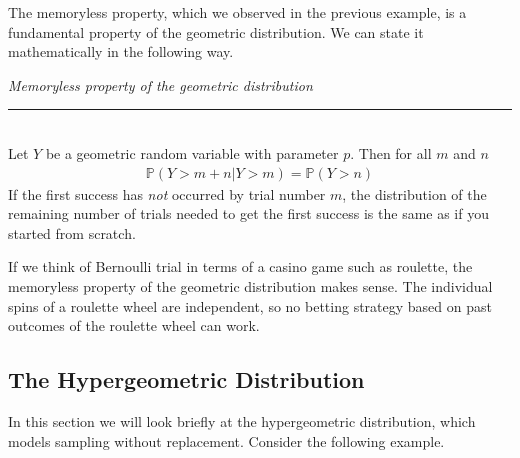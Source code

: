 \documentclass[12pt]{article}
\theoremstyle{definition}
\theoremstyle{remark}
\def\P{{\mathbb P}}
\begin{document}
The memoryless property, which we observed in the previous example, is a fundamental property of the geometric distribution. We can state it mathematically in the following way.

\begin{framed}
\emph{Memoryless property of the geometric distribution}\\
  \rule{\dimexpr{}\fboxrule}{.1pt} \\
Let $Y$ be a geometric random variable with parameter $p$. Then for all $m$ and $n$
\begin{align*}
\P(Y > m + n | Y > m) = \P(Y > n)
\end{align*}
If the first success has \emph{not} occurred by trial number $m$, the distribution of the remaining number of trials needed to get the first success is the same as if you started from scratch.
\end{framed}

If we think of Bernoulli trial in terms of a casino game such as roulette, the memoryless property of the geometric distribution makes sense. The individual spins of a roulette wheel are independent, so no betting strategy based on past outcomes of the roulette wheel can work.

\subsection{The Hypergeometric Distribution}

In this section we will look briefly at the hypergeometric distribution, which models sampling without replacement.
Consider the following example.
\end{document}
